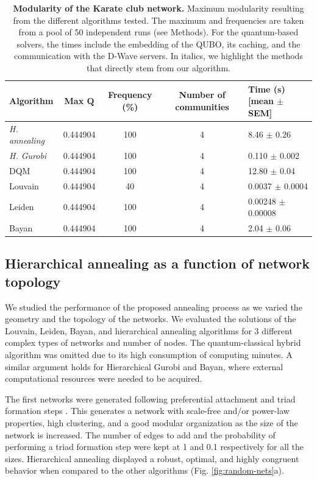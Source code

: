 \documentclass[pdflatex,sn-mathphys-num]{sn-jnl}%
\begin{document}
\begin{table}[h]
    \centering
    \begin{tabular}{l||c|c|c|l}
        \textbf{Algorithm} & \textbf{Max} $\mathbf{Q}$ & \textbf{Frequency} (\%) & \textbf{Number of communities} & \textbf{Time} (s) [mean $\pm$ SEM]\\
        \hline
        \textit{H. annealing} & 0.444904 & 100 & 4 & 8.46 $\pm$ 0.26 \\
        \textit{H. Gurobi} & 0.444904 & 100 & 4 & 0.110 $\pm$ 0.002 \\
        DQM & 0.444904 & 100 & 4 & 12.80 $\pm$ 0.04 \\
        Louvain & 0.444904 & 40 & 4 & 0.0037 $\pm$ 0.0004 \\
        Leiden & 0.444904 & 100 & 4 & 0.00248 $\pm$ 0.00008 \\
        Bayan & 0.444904 & 100 & 4 & 2.04 $\pm$ 0.06 \\
    \end{tabular}
    \caption{\textbf{Modularity of the Karate club network.} Maximum modularity resulting from the different algorithms tested. The maximum and frequencies are taken from a pool of 50 independent runs (see Methods). For the quantum-based solvers, the times include the embedding of the QUBO, its caching, and the communication with the D-Wave servers. In italics, we highlight the methods that directly stem from our algorithm.}
    \label{tab:karate}
\end{table}

\subsection*{Hierarchical annealing as a function of network topology}
We studied the performance of the proposed annealing process as we varied the geometry and the topology of the networks. We evaluated the solutions of the Louvain, Leiden, Bayan, and hierarchical annealing algorithms for 3 different complex types of networks and number of nodes. The quantum-classical hybrid algorithm was omitted due to its high consumption of computing minutes. A similar argument holds for Hierarchical Gurobi and Bayan, where external computational resources were needed to be acquired. 

The first networks were generated following preferential attachment and triad formation steps \cite{Holme2002}. This generates a network with scale-free and/or power-law properties, high clustering, and a good modular organization as the size of the network is increased. The number of edges to add and the probability of performing a triad formation step were kept at 1 and 0.1 respectively for all the sizes. Hierarchical annealing displayed a robust, optimal, and highly congruent behavior when compared to the other algorithms (Fig. \ref{fig:random-nets}a).
\end{document}

